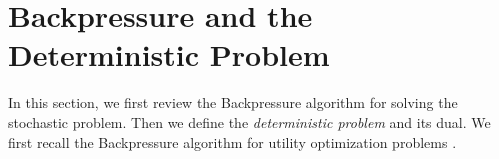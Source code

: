 \documentclass[journal]{IEEEtran}
\newcommand{\bv}[1]{{\boldsymbol{#1} }}
\begin{document}




\vspace{-.1in}
\section{Backpressure and the Deterministic Problem}\label{section:qlareview}
In this section, we first review the Backpressure algorithm \cite{neelynowbook} for solving the stochastic problem. Then we define the \emph{deterministic problem} and its dual. 
We first recall the Backpressure algorithm for utility optimization problems \cite{neelynowbook}. 
\end{document}
